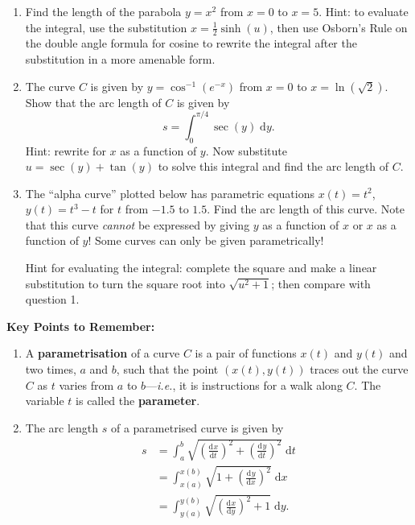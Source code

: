 \documentclass{article}
\newcommand{\deriv}[3][]{\frac{\mathrm{d}^{#1}#2}{\mathrm{d}#3^{#1}}}
\newcommand{\diff}{\;\mathrm{d}}
\begin{document}
\begin{enumerate}
	\item Find the length of the parabola $y=x^2$ from $x=0$ to $x=5$. Hint: to evaluate the integral, use the substitution $x=\frac{1}{2}\sinh(u)$, then use Osborn's Rule on the double angle formula for cosine to rewrite the integral after the substitution in a more amenable form.
	\item The curve $C$ is given by $y=\cos^{-1}\left(e^{-x}\right)$ from $x=0$ to $x=\ln\left(\sqrt{2}\right)$. Show that the arc length of $C$ is given by
		\[s=\int_0^{\pi/4} \sec(y)\diff y.\]
		Hint: rewrite for $x$ as a function of $y$. Now substitute $u=\sec(y)+\tan(y)$ to solve this integral and find the arc length of $C$.
	\item The ``alpha curve'' plotted below has parametric equations $x(t)=t^2$, $y(t)=t^3-t$ for $t$ from $-1.5$ to $1.5$. Find the arc length of this curve. Note that this curve \textit{cannot} be expressed by giving $y$ as a function of $x$ or $x$ as a function of $y$! Some curves can only be given parametrically!
	
		Hint for evaluating the integral: complete the square and make a linear substitution to turn the square root into $\sqrt{u^2+1}$; then compare with question 1.
		\begin{center}
		\end{center}
\end{enumerate}








\clearpage





{\bf Key Points to Remember:}

\vspace{5mm}

\begin{enumerate}
	\item A \textbf{parametrisation} of a curve $C$ is a pair of functions $x(t)$ and $y(t)$ and two times, $a$ and $b$, such that the point $(x(t),y(t))$ traces out the curve $C$ as $t$ varies from $a$ to $b$---\textit{i.e.}, it is instructions for a walk along $C$. The variable $t$ is called the \textbf{parameter}.
	\item The arc length $s$ of a parametrised curve is given by
		\begin{align*}
			s&=\int_a^b \sqrt{\left(\deriv{x}{t}\right)^2+\left(\deriv{y}{t}\right)^2}\diff t\\
			&=\int_{x(a)}^{x(b)}\sqrt{1+\left(\deriv{y}{x}\right)^2}\diff x\\
			&=\int_{y(a)}^{y(b)}\sqrt{\left(\deriv{x}{y}\right)^2+1}\diff y.
		\end{align*}
\end{enumerate}
\end{document}
